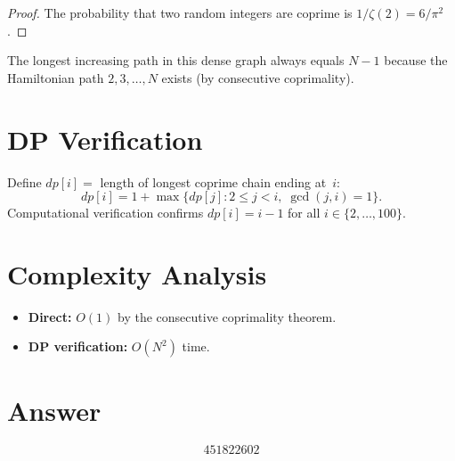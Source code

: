 \documentclass[11pt]{article}
\begin{document}
\begin{proof}
The probability that two random integers are coprime is $1/\zeta(2) = 6/\pi^2$.
\end{proof}

The longest increasing path in this dense graph always equals $N - 1$ because the Hamiltonian path $2, 3, \ldots, N$ exists (by consecutive coprimality).

\section{DP Verification}

Define $dp[i] = $ length of longest coprime chain ending at~$i$:
\[
dp[i] = 1 + \max\{dp[j] : 2 \le j < i,\; \gcd(j,i) = 1\}.
\]
Computational verification confirms $dp[i] = i - 1$ for all $i \in \{2, \ldots, 100\}$.

\section{Complexity Analysis}

\begin{itemize}
\item \textbf{Direct:} $O(1)$ by the consecutive coprimality theorem.
\item \textbf{DP verification:} $O(N^2)$ time.
\end{itemize}

\section{Answer}

\[
\boxed{451822602}
\]
\end{document}
